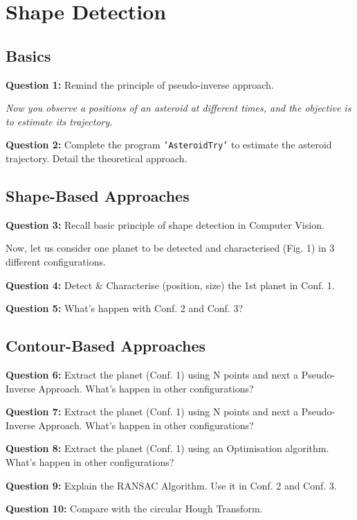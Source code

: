 \section{Shape Detection}
\label{sec:shape_detection}

\subsection{Basics}

\textbf{Question 1:} Remind the principle of pseudo-inverse approach.

\TODO

\textit{Now you observe a positions of an asteroid at different times, and the objective is to estimate its trajectory.}

\textbf{Question 2:} Complete the program \texttt{'AsteroidTry'} to estimate the asteroid trajectory. Detail the theoretical approach.




\subsection{Shape-Based Approaches}

\textbf{Question 3:} Recall basic principle of shape detection in Computer Vision.

Now, let us consider one planet to be detected and characterised (Fig. 1) in 3 different configurations.

\textbf{Question 4:} Detect \& Characterise (position, size) the 1st planet in Conf. 1.

\textbf{Question 5:} What’s happen with Conf. 2 and Conf. 3?








\subsection{Contour-Based Approaches}

\textbf{Question 6:} Extract the planet (Conf. 1) using N points and next a Pseudo-Inverse Approach. What’s happen in other configurations?

\textbf{Question 7:} Extract the planet (Conf. 1) using N points and next a Pseudo-Inverse Approach. What’s happen in other configurations?

\textbf{Question 8:} Extract the planet (Conf. 1) using an Optimisation algorithm. What’s happen in other configurations?

\textbf{Question 9:} Explain the RANSAC Algorithm. Use it in Conf. 2 and Conf. 3.

\textbf{Question 10:} Compare with the circular Hough Transform.